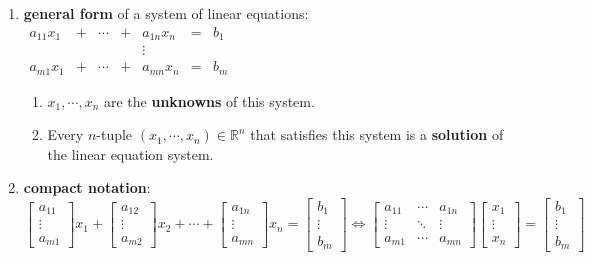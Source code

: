 \begin{enumerate}[itemsep=0.3cm]
    \item \textbf{general form} of a system of linear equations:
    \\
    $
        \begin{aligned}
            a_{11}x_1 & + & \cdots & + & a_{1n}x_n & = & b_1 \\
            & & & & \vdots \\
            a_{m1}x_1 & + & \cdots & + & a_{mn}x_n & = & b_m
        \end{aligned}
    $
    \hfill \cite{mfml/book/mml/Deisenroth-Faisal-Ong}
    \begin{enumerate}
        \item $x_1, \cdots , x_n$ are the \textbf{unknowns} of this system.

        \item Every $n$-tuple $(x_1, \cdots , x_n) \in \mathbb{R}^n$ that satisfies this system is a \textbf{solution} of the linear equation system.
    \end{enumerate}


    \item \textbf{compact notation}:
    \\[0.2cm]
    $
        \begin{bmatrix}a_{11}\\ \vdots\\ a_{m1}\end{bmatrix} x_1 +
        \begin{bmatrix}a_{12}\\ \vdots\\ a_{m2}\end{bmatrix} x_2 +
        \cdots +
        \begin{bmatrix}a_{1n}\\ \vdots\\ a_{mn}\end{bmatrix} x_n =
        \begin{bmatrix}b_{1}\\ \vdots\\ b_{m}\end{bmatrix}
        \Longleftrightarrow
        \begin{bmatrix}
            a_{11} & \cdots & a_{1n} \\
            \vdots & \ddots & \vdots \\
            a_{m1} & \cdots & a_{mn}
        \end{bmatrix}
        \begin{bmatrix} x_{1} \\ \vdots \\ x_{n} \end{bmatrix}
        =
        \begin{bmatrix} b_{1} \\ \vdots \\ b_{m} \end{bmatrix}
    $
    \hfill \cite{mfml/book/mml/Deisenroth-Faisal-Ong}

    
    
\end{enumerate}


